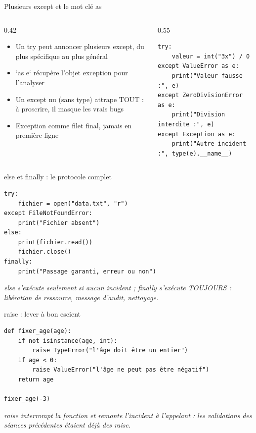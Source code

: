 \documentclass[aspectratio=169,11pt]{beamer}
\begin{document}
\begin{frame}[fragile]{Plusieurs except et le mot clé as}
\begin{columns}[t]
\begin{column}{0.42\textwidth}
\begin{itemize}
  \setlength{\itemsep}{1.5pt}\setlength{\parskip}{0pt}
  \item Un try peut annoncer plusieurs except, du plus spécifique au plus général
  \item `as e` récupère l'objet exception pour l'analyser
  \item Un except nu (sans type) attrape TOUT : à proscrire, il masque les vrais bugs
  \item Exception comme filet final, jamais en première ligne
\end{itemize}
\end{column}
\hspace{0.02\textwidth}
\begin{column}{0.55\textwidth}
\begin{lstlisting}[style=pysmall]
try:
    valeur = int("3x") / 0
except ValueError as e:
    print("Valeur fausse :", e)
except ZeroDivisionError as e:
    print("Division interdite :", e)
except Exception as e:
    print("Autre incident :", type(e).__name__)
\end{lstlisting}
\end{column}
\end{columns}
\end{frame}

\begin{frame}[fragile]{else et finally : le protocole complet}

\begin{lstlisting}[style=py]
try:
    fichier = open("data.txt", "r")
except FileNotFoundError:
    print("Fichier absent")
else:
    print(fichier.read())
    fichier.close()
finally:
    print("Passage garanti, erreur ou non")
\end{lstlisting}
\vspace{0.5pt}

{\small\color{PyGris}\itshape else s'exécute seulement si aucun incident ; finally s'exécute TOUJOURS : libération de ressource, message d'audit, nettoyage.}

\end{frame}

\begin{frame}[fragile]{raise : lever à bon escient}

\begin{lstlisting}[style=py]
def fixer_age(age):
    if not isinstance(age, int):
        raise TypeError("l'âge doit être un entier")
    if age < 0:
        raise ValueError("l'âge ne peut pas être négatif")
    return age

fixer_age(-3)
\end{lstlisting}
\vspace{0.5pt}

{\small\color{PyGris}\itshape raise interrompt la fonction et remonte l'incident à l'appelant : les validations des séances précédentes étaient déjà des raise.}

\end{frame}
\end{document}
